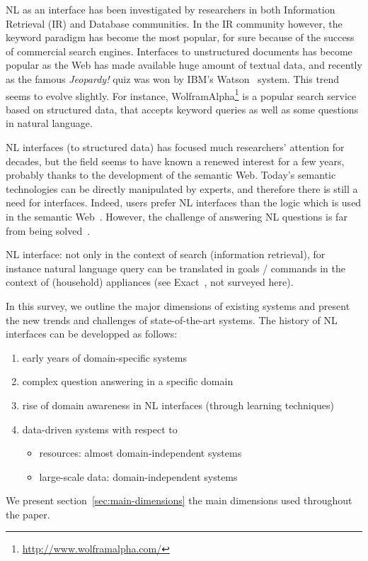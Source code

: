 \documentclass[10pt,journal,letterpaper,compsoc]{IEEEtran}
\begin{document}
NL as an interface has been investigated by researchers in both Information
Retrieval (IR) and Database communities. In the IR community however, the
keyword paradigm has become the most popular, for sure because of the success
of commercial search engines. 
Interfaces to unstructured documents has become popular as
the Web has made available huge amount of textual data, and recently as the
famous {\it Jeopardy!} quiz was won by IBM's {\sc
Watson}~\cite{FerrucciBCFGKLMNPSW10} system.
This trend seems to evolve slightly. For instance,
{\sc WolframAlpha}\footnote{\url{http://www.wolframalpha.com/}} is a popular
search service based on structured data, that accepts keyword queries as well
as some questions in natural language.

NL interfaces (to structured data) has focused much researchers' attention for
decades, but the field seems to have known a renewed interest for a few
years, probably thanks to the development of the semantic Web. 
Today's semantic technologies can be directly manipulated by experts, and
therefore there is still a need for interfaces. Indeed, users prefer NL
interfaces than the logic which is used in the semantic
Web~\cite{Kotov:2010:TNQ:1772690.1772746}.
However, the challenge of answering NL questions is far from being
solved~\cite{Kotov:2010:TNQ:1772690.1772746}.

NL interface: not only in the context of search (information retrieval), for
instance natural language query can be translated in goals / commands in the
context of (household) appliances (see {\sc
Exact}~\cite{Yates:2003:RNL:604045.604075}, not surveyed here).



In this survey, we outline the major dimensions of existing systems
and present the new trends and challenges of state-of-the-art systems.
The history of NL interfaces can be developped as follows:
\begin{enumerate}
  \item early years of domain-specific systems
  \item complex question answering in a specific domain
  \item rise of domain awareness in NL interfaces (through learning techniques)
  \item data-driven systems with respect to
  \begin{itemize}
    \item resources: almost domain-independent systems
    \item large-scale data: domain-independent systems
  \end{itemize}
\end{enumerate}
We present section~\ref{sec:main-dimensions} the main dimensions used throughout
the paper. 
\end{document}
